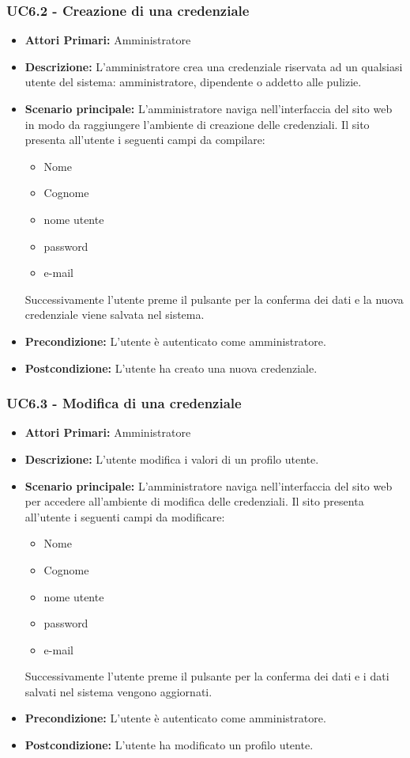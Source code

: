 \subsubsection{ UC6.2 - Creazione di una credenziale}
\begin{itemize}
	\item\textbf{Attori Primari:}
	Amministratore 
	\item\textbf{Descrizione:} 
	L'amministratore crea una credenziale riservata ad un qualsiasi utente del sistema: amministratore, dipendente o addetto alle pulizie.
	\item\textbf{Scenario principale:} 
	L'amministratore naviga nell'interfaccia del sito web in modo da raggiungere l'ambiente di creazione delle credenziali.
	Il sito presenta all'utente i seguenti campi da compilare:
	\begin{itemize}
		\item Nome
		\item Cognome
		\item nome utente
		\item password
		\item e-mail
	\end{itemize}
	Successivamente l'utente preme il pulsante per la conferma dei dati e la nuova credenziale viene salvata nel sistema.
	\item\textbf{Precondizione:} 
	L'utente è autenticato come amministratore.
	\item\textbf{Postcondizione:}
	L'utente ha creato una nuova credenziale.
\end{itemize}

\subsubsection{ UC6.3 - Modifica di una credenziale}
\begin{itemize}
	\item\textbf{Attori Primari:} 
	Amministratore
	\item\textbf{Descrizione:} 
	L'utente modifica i valori di un profilo utente.
	\item\textbf{Scenario principale:} 
	L'amministratore naviga nell'interfaccia del sito web per accedere all'ambiente di modifica delle credenziali.
	Il sito presenta all'utente i seguenti campi da modificare:
	\begin{itemize}
		\item Nome
		\item Cognome
		\item nome utente
		\item password
		\item e-mail
	\end{itemize}
	Successivamente l'utente preme il pulsante per la conferma dei dati e i dati salvati nel sistema vengono aggiornati.
	\item\textbf{Precondizione:} 
	L'utente è autenticato come amministratore.
	\item\textbf{Postcondizione:}
	L'utente ha modificato un profilo utente.
\end{itemize}

